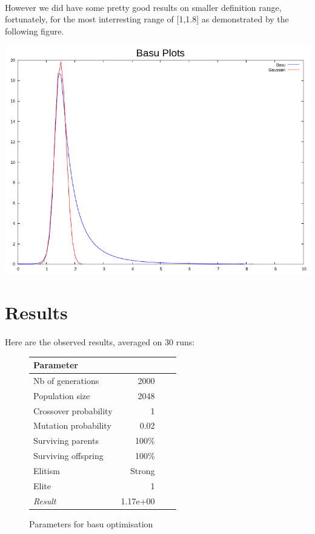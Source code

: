 \documentclass{article}
\begin{document}
    \paragraph{} %
    \label{par:}
      However we did have some pretty good results on smaller definition range,
      fortunately, for the most interresting range of [1,1.8] as demonstrated by the
      following figure.

    \includegraphics[scale=0.3]{basu_best}
    
   
   \section{Results} %
   \label{sec:Result}
   \paragraph{} %
   
     \label{par:}
       Here are the observed results, averaged on 30 runs:
    
    \begin{figure}
    \begin{small} 
    \begin{tabular}{lrrr}
      Parameter &  \\
      \hline
      Nb of generations & 2000 \\
      Population size & 2048  \\
      Crossover probability & 1 \\
      Mutation probability & 0.02\\
      Surviving parents & 100\%  \\
      Surviving offspring& 100\% \\
      Elitism & Strong \\
      Elite & 1 \\ \hline
      \emph{Result} & 1.17e+00 \\
      \hline 
      \end{tabular}
      \caption{Parameters for basu optimisation}
    \end{small}
    \end{figure}
\end{document}

